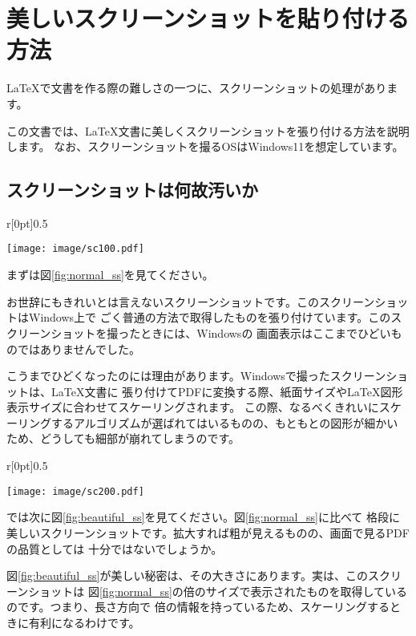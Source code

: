 \chapter{美しいスクリーンショットを貼り付ける方法}
\label{chap:screenshot}

\LaTeX で文書を作る際の難しさの一つに、スクリーンショットの処理があります。

この文書では、\LaTeX 文書に美しくスクリーンショットを張り付ける方法を説明します。
なお、スクリーンショットを撮るOSはWindows11を想定しています。

\section{スクリーンショットは何故汚いか}

\begin{wrapfigure}{r}[0pt]{0.5\textwidth}
  \begin{center}
    \texttt{[image: image/sc100.pdf]}
    \caption{スクリーンショット} \label{fig:normal_ss}
  \end{center}
\end{wrapfigure}

まずは図\ref{fig:normal_ss}を見てください。

お世辞にもきれいとは言えないスクリーンショットです。このスクリーンショットはWindows上で
ごく普通の方法で取得したものを張り付けています。このスクリーンショットを撮ったときには、Windowsの
画面表示はここまでひどいものではありませんでした。

こうまでひどくなったのには理由があります。Windowsで撮ったスクリーンショットは、\LaTeX 文書に
張り付けてPDFに変換する際、紙面サイズや\LaTeX 図形表示サイズに合わせてスケーリングされます。
この際、なるべくきれいにスケーリングするアルゴリズムが選ばれてはいるものの、もともとの図形が細かい
ため、どうしても細部が崩れてしまうのです。


\begin{wrapfigure}{r}[0pt]{0.5\textwidth}
  \begin{center}
    \texttt{[image: image/sc200.pdf]}
    \caption{スクリーンショット} \label{fig:beautiful_ss}
  \end{center}
\end{wrapfigure}

では次に図\ref{fig:beautiful_ss}を見てください。図\ref{fig:normal_ss}に比べて
格段に美しいスクリーンショットです。拡大すれば粗が見えるものの、画面で見るPDFの品質としては
十分ではないでしょうか。

図\ref{fig:beautiful_ss}が美しい秘密は、その大きさにあります。実は、このスクリーンショットは
図\ref{fig:normal_ss}の倍のサイズで表示されたものを取得しているのです。つまり、長さ方向で
倍の情報を持っているため、スケーリングするときに有利になるわけです。

